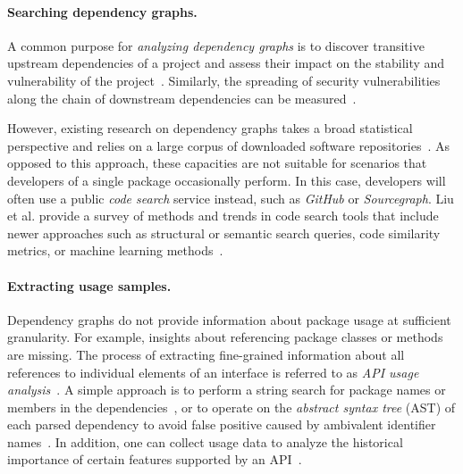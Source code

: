 \documentclass[a4paper,twoside]{article}
\begin{document}
\paragraph{Searching dependency graphs.}
\label{sec:related_work/dependencies}
%
A common purpose for \emph{analyzing dependency graphs} is to discover transitive upstream dependencies of a project and assess their impact on the stability and vulnerability of the project~\cite{kikas2017structure}.
Similarly, the spreading of security vulnerabilities along the chain of downstream dependencies can be measured~\cite{decan2018impact}.

However, existing research on dependency graphs takes a broad statistical perspective and relies on a large corpus of downloaded software repositories~\cite{abdalkareem2017developers,kikas2017structure,katz2020libraries}.
As opposed to this approach, these capacities are not suitable for scenarios that developers of a single package occasionally perform.
In this case, developers will often use a public \emph{code search} service instead, such as \emph{GitHub} or \emph{Sourcegraph}.
Liu et al. provide a survey of methods and trends in code search tools that include newer approaches such as structural or semantic search queries, code similarity metrics, or machine learning methods~\cite{liu2020opportunities}.


\paragraph{Extracting usage samples.}
\label{sec:related_work/usage_samples}
%
Dependency graphs do not provide information about package usage at sufficient granularity. For example, insights about referencing package classes or methods are missing.
The process of extracting fine-grained information about all references to individual elements of an interface is referred to as \emph{API usage analysis}~\cite{lammel2011large}.
A simple approach is to perform a string search for package names or members in the dependencies~\cite{mileva2010mining}, or to operate on the \emph{abstract syntax tree} (AST) of each parsed dependency to avoid false positive caused by ambivalent identifier names~\cite{qiu2016understanding}.
In addition, one can collect usage data to analyze the historical importance of certain features supported by an API~\cite{sawant2017fine}.
\end{document}
